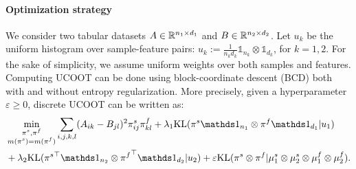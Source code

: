 \paragraph{Optimization strategy}
We consider two tabular datasets $A \in \mathbb R^{n_1 \times d_1}$ and $B \in \mathbb R^{n_2 \times d_2}$.
Let $u_k$ be the uniform histogram over sample-feature pairs:
$u_k := \frac{1}{n_kd_k}\mathds 1_{n_k} \otimes \mathds 1_{d_k}$, for $k=1, 2$.
For the sake of simplicity, we assume uniform weights over both samples and features.
Computing UCOOT can be done using block-coordinate descent (BCD) both with
and without entropy regularization. More precisely, given a hyperparameter $\varepsilon \geq 0$,
discrete UCOOT can be written as:
\begin{equation}
\begin{split}
    \label{eq:ucoot-discrete-2}
  &\min_{\substack{\pi^s, \pi^f \\
  \iffalse \in \bbR_+^{n_1, n_2} \\ \pi^f \in \bbR_+^{d_1, d_2} \\ \fi m(\pi^s) = m(\pi^f)}}
  \sum_{i, j, k, l} (A_{ik} - B_{jl})^2\pi^s_{ij}\pi^f_{kl} +
  \lambda_1 \kl(\pi^s \mathds 1_{n_1} \otimes \pi^f \mathds 1_{d_1} | u_1 )  \\
  &+ \lambda_2 \kl({\pi^s}^\top \mathds 1_{n_2} \otimes {\pi^f}^{\top} \mathds 1_{d_2} | u_2) +
  \varepsilon \text{KL}( \pi^s \otimes \pi^f | \mu^s_1 \otimes \mu_2^s \otimes \mu_1^f \otimes \mu_2^f).
\end{split}
\end{equation}

